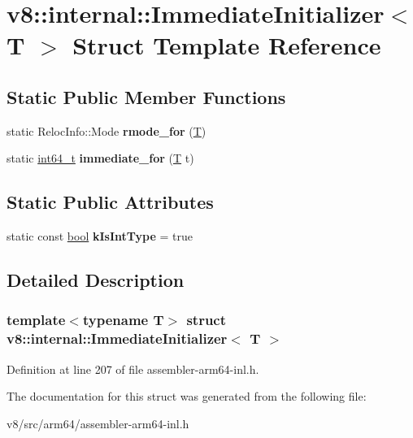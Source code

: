 \hypertarget{structv8_1_1internal_1_1ImmediateInitializer}{}\section{v8\+:\+:internal\+:\+:Immediate\+Initializer$<$ T $>$ Struct Template Reference}
\label{structv8_1_1internal_1_1ImmediateInitializer}
\subsection*{Static Public Member Functions}
\begin{DoxyCompactItemize}
\item 
\mbox{\label{structv8_1_1internal_1_1ImmediateInitializer_a844c902980afb8efddc3cb4c54d849f7}} 
static Reloc\+Info\+::\+Mode {\bfseries rmode\+\_\+for} (\mbox{\hyperlink{classv8_1_1internal_1_1torque_1_1T}{T}})
\item 
\mbox{\label{structv8_1_1internal_1_1ImmediateInitializer_a75cc19b5515e530e2a4b1b5cc84ec29a}} 
static \mbox{\hyperlink{classint64__t}{int64\+\_\+t}} {\bfseries immediate\+\_\+for} (\mbox{\hyperlink{classv8_1_1internal_1_1torque_1_1T}{T}} t)
\end{DoxyCompactItemize}
\subsection*{Static Public Attributes}
\begin{DoxyCompactItemize}
\item 
\mbox{\label{structv8_1_1internal_1_1ImmediateInitializer_a11c7f92fe5114961edba9b85a1b48ef1}} 
static const \mbox{\hyperlink{classbool}{bool}} {\bfseries k\+Is\+Int\+Type} = true
\end{DoxyCompactItemize}


\subsection{Detailed Description}
\subsubsection*{template$<$typename T$>$\newline
struct v8\+::internal\+::\+Immediate\+Initializer$<$ T $>$}



Definition at line 207 of file assembler-\/arm64-\/inl.\+h.



The documentation for this struct was generated from the following file\+:\begin{DoxyCompactItemize}
\item 
v8/src/arm64/assembler-\/arm64-\/inl.\+h\end{DoxyCompactItemize}
